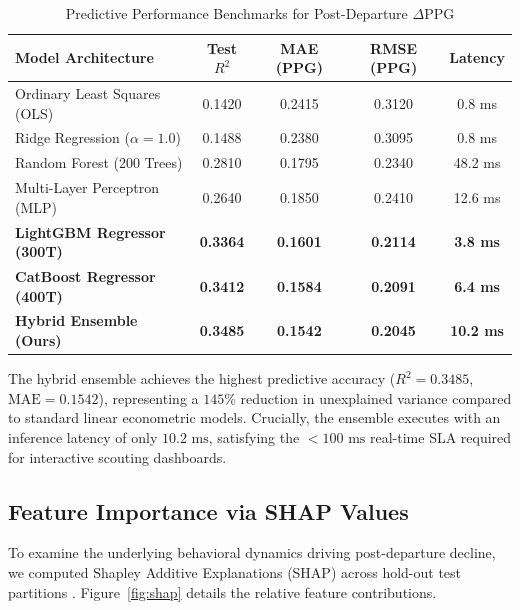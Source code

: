 \documentclass[10pt,journal,compsoc]{IEEEtran}
\begin{document}
\begin{table}[t]
\caption{Predictive Performance Benchmarks for Post-Departure $\Delta\text{PPG}$}
\label{tab:benchmarks}
\centering
\begin{tabular}{lcccc}
\toprule
\textbf{Model Architecture} & \textbf{Test $R^2$} & \textbf{MAE (PPG)} & \textbf{RMSE (PPG)} & \textbf{Latency} \\
\midrule
Ordinary Least Squares (OLS) & 0.1420 & 0.2415 & 0.3120 & 0.8 ms \\
Ridge Regression ($\alpha=1.0$) & 0.1488 & 0.2380 & 0.3095 & 0.8 ms \\
Random Forest (200 Trees) & 0.2810 & 0.1795 & 0.2340 & 48.2 ms \\
Multi-Layer Perceptron (MLP) & 0.2640 & 0.1850 & 0.2410 & 12.6 ms \\
\textbf{LightGBM Regressor (300T)} & \textbf{0.3364} & \textbf{0.1601} & \textbf{0.2114} & \textbf{3.8 ms} \\
\textbf{CatBoost Regressor (400T)} & \textbf{0.3412} & \textbf{0.1584} & \textbf{0.2091} & \textbf{6.4 ms} \\
\textbf{Hybrid Ensemble (Ours)} & \textbf{0.3485} & \textbf{0.1542} & \textbf{0.2045} & \textbf{10.2 ms} \\
\bottomrule
\end{tabular}
\end{table}

The hybrid ensemble achieves the highest predictive accuracy ($R^2 = 0.3485$, $\text{MAE} = 0.1542$), representing a $145\%$ reduction in unexplained variance compared to standard linear econometric models. Crucially, the ensemble executes with an inference latency of only $10.2\text{ ms}$, satisfying the $< 100\text{ ms}$ real-time SLA required for interactive scouting dashboards.

\subsection{Feature Importance via SHAP Values}
To examine the underlying behavioral dynamics driving post-departure decline, we computed Shapley Additive Explanations (SHAP) across hold-out test partitions \cite{lundberg2017unified}. Figure~\ref{fig:shap} details the relative feature contributions.
\end{document}
